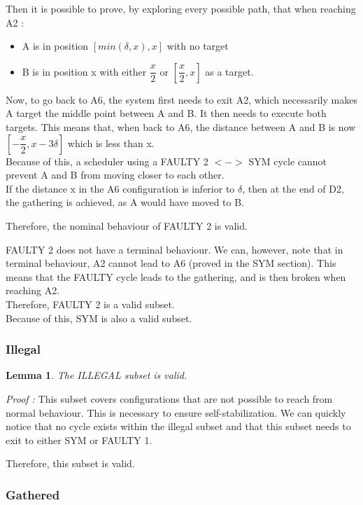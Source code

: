 \documentclass[11pt]{article}
\newtheorem{Lemma}{Lemma}
\begin{document}
Then it is possible to prove, by exploring every possible path, that when reaching A2  :

\begin{itemize}
\item A is in position $[min(\delta,x),x]$ with no target
\item B is in position x with either $\dfrac{x}{2}$ or $[\dfrac{x}{2},x]$ as a target.
\end{itemize}

Now, to go back to A6, the system first needs to exit A2, which necessarily makes A target the middle point between A and B. It then needs to execute both targets. 
This means that, when back to A6, the distance between A and B is now $[-\dfrac{x}{2},x-3\delta]$ which is less than x.
\\
Because of this, a scheduler using a FAULTY 2 $<->$ SYM cycle cannot prevent A and B from moving closer to each other. 
\\
If the distance x in the A6 configuration is inferior to $\delta$, then at the end of D2, the gathering is achieved, as A would have moved to B.

Therefore, the nominal behaviour of FAULTY 2 is valid.

FAULTY 2 does not have a terminal behaviour. We can, however, note that in terminal behaviour, A2 cannot lead to A6 (proved in the SYM section). This means that the FAULTY cycle leads to the gathering, and is then broken when reaching A2.
\\
Therefore, FAULTY 2 is a valid subset.
\\
Because of this, SYM is also a valid subset.

\subsubsection{Illegal}
\begin{Lemma}
The ILLEGAL subset is valid.
\end{Lemma}


\textit{Proof :}
This subset covers configurations that are not possible to reach from normal behaviour. This is necessary to ensure self-stabilization. 
We can quickly notice that no cycle exists within the illegal subset and that this subset needs to exit to either SYM or FAULTY 1.

Therefore, this subset is valid.

\subsubsection{Gathered}
\end{document}
